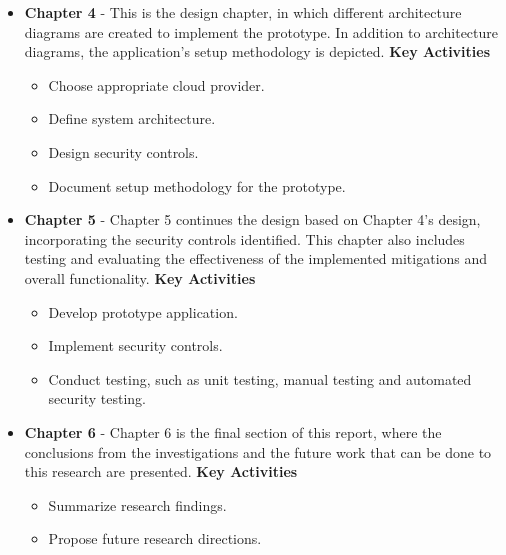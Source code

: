 \begin{itemize}
    \item \textbf{Chapter 4} - This is the design chapter, in which different architecture diagrams are created to implement the prototype. In addition to architecture diagrams, the application's setup methodology is depicted.\newline
   \textbf{Key Activities}
   \begin{itemize}
        \item Choose appropriate cloud provider.
        \item Define system architecture.
        \item Design security controls.
        \item Document setup methodology for the prototype.
    \end{itemize}
    
    \item \textbf{Chapter 5} - Chapter 5 continues the design based on Chapter 4's design, incorporating the security controls identified. This chapter also includes testing and evaluating the effectiveness of the implemented mitigations and overall functionality.\newline
       \textbf{Key Activities}
   \begin{itemize}
        \item Develop prototype application.
        \item Implement security controls.
        \item Conduct testing, such as unit testing, manual testing and automated security testing.
    \end{itemize}
    
    \item \textbf{Chapter 6} - Chapter 6 is the final section of this report, where the conclusions from the investigations and the future work that can be done to this research are presented.\newline
       \textbf{Key Activities}
        \begin{itemize}
            \item Summarize research findings.
            \item Propose future research directions.
        \end{itemize}

\end{itemize}